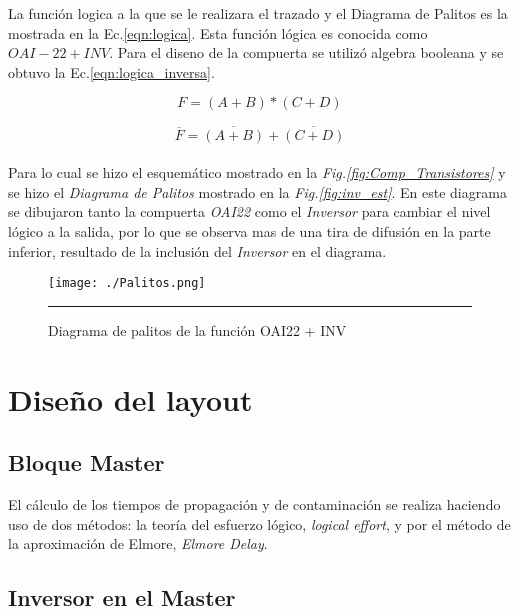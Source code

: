 \documentclass[12pt,a4paper]{article} %
\begin{document}
La función logica a la que se le realizara el trazado y el Diagrama de Palitos es la mostrada en la Ec.\ref{eqn:logica}. Esta función lógica es conocida como $OAI-22 + INV.$ Para el diseno de la compuerta se utilizó algebra booleana y se obtuvo la Ec.\ref{eqn:logica_inversa}.

\begin{equation}\label{eqn:logica}
F=(A+B)*(C+D)
\end{equation}

\begin{equation}\label{eqn:logica_inversa}
\overline{F}=\overline{(A+B)}+\overline{(C+D)}
\end{equation}\\


Para lo cual se hizo el esquemático mostrado en la \textit{Fig.\ref{fig:Comp_Transistores}} y se hizo el \textit{Diagrama de Palitos} mostrado en la \textit{Fig.\ref{fig:inv_est}}. En este diagrama se dibujaron tanto la compuerta \textit{OAI22} como el \textit{Inversor} para cambiar el nivel lógico a la salida, por lo que se observa mas de una tira de difusión en la parte inferior, resultado de la inclusión del \textit{Inversor} en el diagrama.\\

\begin{figure}[htbp]
  \centering
    \texttt{[image: ./Palitos.png]}
    \rule{35em}{0.5pt}
  \caption[IdealvsSim]{Diagrama de palitos de la función OAI22 + INV}
  \label{fig:pal}
\end{figure}

\section{Diseño del layout}

\subsection{Bloque Master}

El cálculo de los tiempos de propagación y de contaminación se realiza haciendo uso de dos métodos: la teoría del esfuerzo lógico, \textit{logical effort}, y por el método de la aproximación de Elmore, \textit{Elmore Delay}.\\

\subsection{Inversor en el Master}
\end{document}
